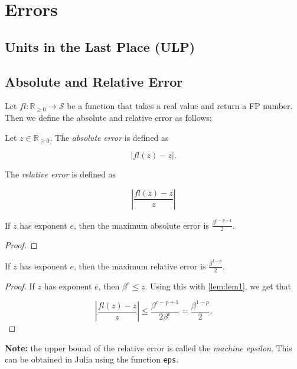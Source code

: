 \documentclass[]{book}
\theoremstyle{definition}
\theoremstyle{definition}
\theoremstyle{definition}
\theoremstyle{remark}
\let\BeginKnitrBlock\begin \let\EndKnitrBlock\end
\begin{document}
\section{Errors}\label{errors}

\subsection{Units in the Last Place
(ULP)}\label{units-in-the-last-place-ulp}

\subsection{Absolute and Relative
Error}\label{absolute-and-relative-error}

Let \(fl: \mathbb{R}_{\geq 0} \rightarrow \mathcal{S}\) be a function
that takes a real value and return a FP number. Then we define the
absolute and relative error as follows:

\BeginKnitrBlock{definition}
\protect\hypertarget{def:unnamed-chunk-5}{}{\label{def:unnamed-chunk-5} }Let
\(z \in \mathbb{R}_{\geq 0}\). The \emph{absolute error} is defined as

\[
\left | fl(z) - z \right | .
\]

The \emph{relative error} is defined as

\[
\left | \frac{fl(z)-z}{z} \right |
\]
\EndKnitrBlock{definition}

\BeginKnitrBlock{lemma}
\protect\hypertarget{lem:lem1}{}{\label{lem:lem1} }If \(z\) has exponent
\(e\), then the maximum absolute error is \(\frac{\beta^{e-p+1}}{2}\).
\EndKnitrBlock{lemma}

\BeginKnitrBlock{proof}
\iffalse{} {Proof. } \fi{}
\EndKnitrBlock{proof}

\BeginKnitrBlock{lemma}
\protect\hypertarget{lem:unnamed-chunk-7}{}{\label{lem:unnamed-chunk-7} }If
\(z\) has exponent \(e\), then the maximum relative error is
\(\frac{\beta^{1-p}}{2}\).
\EndKnitrBlock{lemma}

\BeginKnitrBlock{proof}
\iffalse{} {Proof. } \fi{}If \(z\) has exponent \(e\), then
\(\beta^{e}\leq z\). Using this with \ref{lem:lem1}, we get that

\[
\left | \frac{fl(z)-z}{z} \right | \leq \frac{\beta^{e-p+1}}{2\beta^e} = \frac{\beta^{1-p}}{2}.
\]
\EndKnitrBlock{proof}

\textbf{Note:} the upper bound of the relative error is called the
\emph{machine epsilon}. This can be obtained in Julia using the function
\texttt{eps}.
\end{document}
